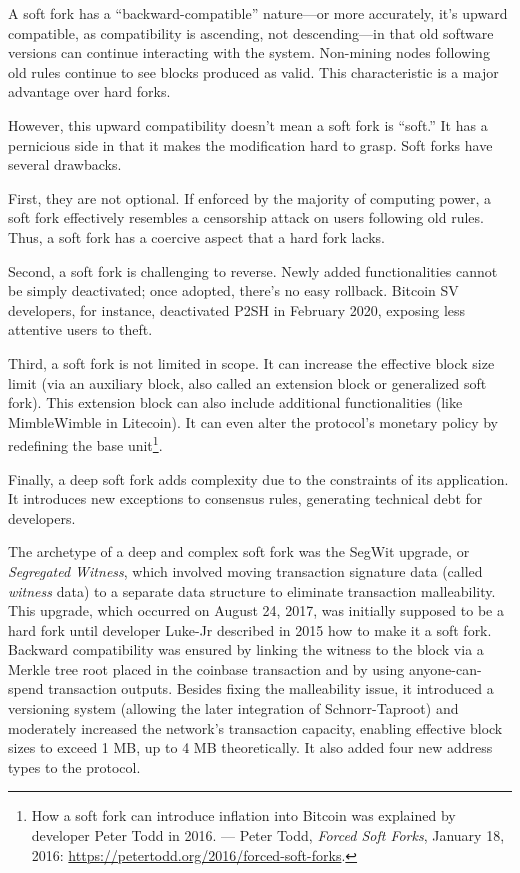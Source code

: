 \documentclass[
  a5paper,
  smalldemyvopaper,10pt,twoside,onecolumn,openright,extrafontsizes,hidelinks]{memoir}
\begin{document}
A soft fork has a ``backward-compatible'' nature---or more accurately,
it's upward compatible, as compatibility is ascending, not
descending---in that old software versions can continue interacting with
the system. Non-mining nodes following old rules continue to see blocks
produced as valid. This characteristic is a major advantage over hard
forks.

However, this upward compatibility doesn't mean a soft fork is ``soft.''
It has a pernicious side in that it makes the modification hard to
grasp. Soft forks have several drawbacks.

First, they are not optional. If enforced by the majority of computing
power, a soft fork effectively resembles a censorship attack on users
following old rules. Thus, a soft fork has a coercive aspect that a hard
fork lacks.

Second, a soft fork is challenging to reverse. Newly added
functionalities cannot be simply deactivated; once adopted, there's no
easy rollback. Bitcoin SV developers, for instance, deactivated P2SH in
February 2020, exposing less attentive users to theft.

Third, a soft fork is not limited in scope. It can increase the
effective block size limit (via an auxiliary block, also called an
extension block or generalized soft fork). This extension block can also
include additional functionalities (like MimbleWimble in Litecoin). It
can even alter the protocol's monetary policy by redefining the base
unit\footnote{How a soft fork can introduce inflation into Bitcoin was
  explained by developer Peter Todd in 2016. --- Peter Todd,
  \emph{Forced Soft Forks}, January 18, 2016:
  \url{https://petertodd.org/2016/forced-soft-forks}.}.

Finally, a deep soft fork adds complexity due to the constraints of its
application. It introduces new exceptions to consensus rules, generating
technical debt for developers.

The archetype of a deep and complex soft fork was the SegWit upgrade, or
\emph{Segregated Witness}, which involved moving transaction signature
data (called \emph{witness} data) to a separate data structure to
eliminate transaction malleability. This upgrade, which occurred on
August 24, 2017, was initially supposed to be a hard fork until
developer Luke-Jr described in 2015 how to make it a soft fork. Backward
compatibility was ensured by linking the witness to the block via a
Merkle tree root placed in the coinbase transaction and by using
anyone-can-spend transaction outputs. Besides fixing the malleability
issue, it introduced a versioning system (allowing the later integration
of Schnorr-Taproot) and moderately increased the network's transaction
capacity, enabling effective block sizes to exceed 1 MB, up to 4 MB
theoretically. It also added four new address types to the protocol.
\end{document}
